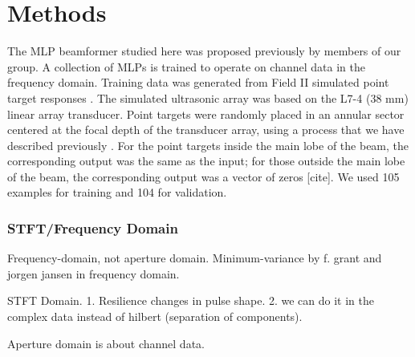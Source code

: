 \chapter{Methods}


The MLP beamformer studied here was proposed previously by members of our group\cite{luchies_tmi_2018}. A collection of MLPs is trained to operate on channel data in the frequency domain. Training data was generated from Field II simulated point target responses \cite{field_ii}. The simulated ultrasonic array was based on the L7-4 (38 mm) linear array transducer. Point targets were randomly placed in an annular sector centered at the focal depth of the transducer array, using a process that we have described previously \cite{training_improvements}. For the point targets inside the main lobe of the beam, the corresponding output was the same as the input; for those outside the main lobe of the beam, the corresponding output was a vector of zeros [cite]. We used 105 examples for training and 104 for validation.



\subsection{STFT/Frequency Domain}

Frequency-domain, not aperture domain. Minimum-variance by f. grant and jorgen jansen in frequency domain.

STFT Domain. 1. Resilience changes in pulse shape. 2. we can do it in the complex data instead of hilbert (separation of components).

Aperture domain is about channel data.
